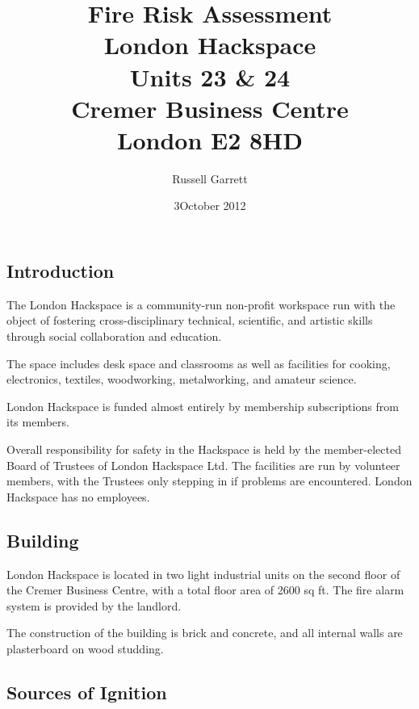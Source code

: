 \title{Fire Risk Assessment\\
    London Hackspace \\
    Units 23 \& 24\\
    Cremer Business Centre\\
    London E2 8HD
}


\date{3\rd October 2012}

\author{Russell Garrett}

\maketitle

\subsection{Introduction}

The London Hackspace is a community-run non-profit workspace run with
the object of fostering cross-disciplinary technical, scientific, and
artistic skills through social collaboration and education.

The space includes desk space and classrooms as well as facilities for
cooking, electronics, textiles, woodworking, metalworking, and amateur
science.

London Hackspace is funded almost entirely by membership subscriptions
from its members.

Overall responsibility for safety in the Hackspace is held by the
member-elected Board of Trustees of London Hackspace Ltd. The facilities
are run by volunteer members, with the Trustees only stepping in if
problems are encountered. London Hackspace has no employees.

\subsection{Building}

London Hackspace is located in two light industrial units on the second
floor of the Cremer Business Centre, with a total floor area of 2600 sq
ft. The fire alarm system is provided by the landlord.

The construction of the building is brick and concrete, and all internal
walls are plasterboard on wood studding.

\subsection{Sources of Ignition}

